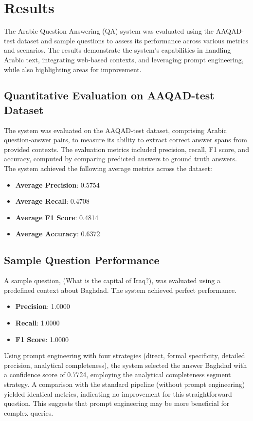 \documentclass[conference]{IEEEtran}
\begin{document}
\section{Results}
The Arabic Question Answering (QA) system was evaluated using the AAQAD-test dataset and sample questions to assess its performance across various metrics and scenarios. The results demonstrate the system’s capabilities in handling Arabic text, integrating web-based contexts, and leveraging prompt engineering, while also highlighting areas for improvement.

\subsection{Quantitative Evaluation on AAQAD-test Dataset}

The system was evaluated on the AAQAD-test dataset, comprising Arabic question-answer pairs, to measure its ability to extract correct answer spans from provided contexts. The evaluation metrics included precision, recall, F1 score, and accuracy, computed by comparing predicted answers to ground truth answers. The system achieved the following average metrics across the dataset:
\begin{itemize}
    \item \textbf{Average Precision}: 0.5754
    \item \textbf{Average Recall}: 0.4708
    \item \textbf{Average F1 Score}: 0.4814
    \item \textbf{Average Accuracy}: 0.6372
\end{itemize}

\subsection{Sample Question Performance}

A sample question, (What is the capital of Iraq?), was evaluated using a predefined context about Baghdad. The system achieved perfect performance.

\begin{itemize}
    \item \textbf{Precision}: 1.0000
    \item \textbf{Recall}: 1.0000
    \item \textbf{F1 Score}: 1.0000
\end{itemize}


Using prompt engineering with four strategies (direct, formal specificity, detailed precision, analytical completeness), the system selected the answer Baghdad with a confidence score of 0.7724, employing the analytical completeness segment strategy. A comparison with the standard pipeline (without prompt engineering) yielded identical metrics, indicating no improvement for this straightforward question. This suggests that prompt engineering may be more beneficial for complex queries.
\end{document}

